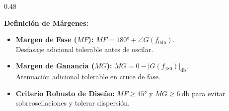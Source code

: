 \begin{frame}
\begin{columns}[t, onlytextwidth]
    \begin{column}{0.48\textwidth}
      \begin{tarjeta}
        {\fontsize{9pt}{10.5pt}\selectfont \textbf{\color{NavyDark} Definición de Márgenes:}}\\[2pt]
        {\fontsize{7.5pt}{9pt}\selectfont
        \begin{itemize}\setlength{\itemsep}{2pt}
          \item \textbf{Margen de Fase ($MF$):}
          $MF = \ang{180} + \angle G(f_{0\si{\decibel}})$.\\
          Desfasaje adicional tolerable antes de oscilar.
          \item \textbf{Margen de Ganancia ($MG$):}
          $MG = 0 - |G(f_{180})|_{\si{\decibel}}$.\\
          Atenuación adicional tolerable en cruce de fase.
          \item \textbf{Criterio Robusto de Diseño:}
          $MF \ge \ang{45}$ y $MG \ge \qty{6}{\decibel}$ para evitar sobreoscilaciones y tolerar dispersión.
        \end{itemize}
        }
      \end{tarjeta}
    \end{column}
  \end{columns}
\end{frame}

